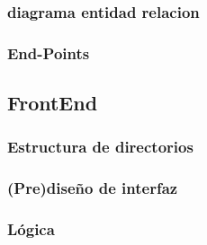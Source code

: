     \subsubsection{diagrama entidad relacion}

    \subsubsection{End-Points}
    
\subsection{FrontEnd}

    \subsubsection{Estructura de directorios}
    
    \subsubsection{ (Pre)diseño de interfaz }
    
    \subsubsection{ Lógica }